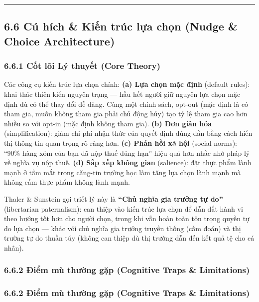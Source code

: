\documentclass[
]{article}
\begin{document}
\begin{center}\rule{0.5\linewidth}{0.5pt}\end{center}

\subsection{6.6 Cú hích \& Kiến trúc lựa chọn (Nudge \& Choice
Architecture)}\label{cuxfa-huxedch-kiux1ebfn-truxfac-lux1ef1a-chux1ecdn-nudge-choice-architecture}

\subsubsection{6.6.1 Cốt lõi Lý thuyết (Core
Theory)}\label{cux1ed1t-luxf5i-luxfd-thuyux1ebft-core-theory-13}

Các công cụ kiến trúc lựa chọn chính: \textbf{(a) Lựa chọn mặc định}
(default rules): khai thác thiên kiến nguyên trạng --- hầu hết người giữ
nguyên lựa chọn mặc định dù có thể thay đổi dễ dàng. Cùng một chính
sách, opt-out (mặc định là có tham gia, muốn không tham gia phải chủ
động hủy) tạo tỷ lệ tham gia cao hơn nhiều so với opt-in (mặc định không
tham gia). \textbf{(b) Đơn giản hóa} (simplification): giảm chi phí nhận
thức của quyết định đúng đắn bằng cách hiển thị thông tin quan trọng rõ
ràng hơn. \textbf{(c) Phản hồi xã hội} (social norms): ``90\% hàng xóm
của bạn đã nộp thuế đúng hạn'' hiệu quả hơn nhắc nhở pháp lý về nghĩa vụ
nộp thuế. \textbf{(d) Sắp xếp không gian} (salience): đặt thực phẩm lành
mạnh ở tầm mắt trong căng-tin trường học làm tăng lựa chọn lành mạnh mà
không cấm thực phẩm không lành mạnh.

Thaler \& Sunstein gọi triết lý này là \textbf{``Chủ nghĩa gia trưởng tự
do''} (libertarian paternalism): can thiệp vào kiến trúc lựa chọn để dẫn
dắt hành vi theo hướng tốt hơn cho người chọn, trong khi vẫn hoàn toàn
tôn trọng quyền tự do lựa chọn --- khác với chủ nghĩa gia trưởng truyền
thống (cấm đoán) và thị trường tự do thuần túy (không can thiệp dù thị
trường dẫn đến kết quả tệ cho cá nhân).

\subsubsection{6.6.2 Điểm mù thường gặp (Cognitive Traps \&
Limitations)}\label{ux111iux1ec3m-muxf9-thux1b0ux1eddng-gux1eb7p-cognitive-traps-limitations-25}

\subsubsection{6.6.2 Điểm mù thường gặp (Cognitive Traps \&
Limitations)}\label{ux111iux1ec3m-muxf9-thux1b0ux1eddng-gux1eb7p-cognitive-traps-limitations-26}
\end{document}
